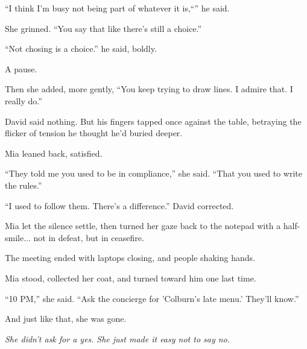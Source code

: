 ``I think I’m busy not being part of whatever it is,``'' he said.

She grinned. ``You say that like there’s still a choice.''

``Not chosing is a choice.'' he said, boldly.

A pause.

Then she added, more gently, ``You keep trying to draw lines. I admire that. I really do.''

David said nothing. But his fingers tapped once against the table, betraying the flicker of tension he thought 
he’d buried deeper.

Mia leaned back, satisfied.

``They told me you used to be in compliance,'' she said. ``That you used to write the rules.''

``I used to follow them. There's a difference.'' David corrected.

Mia let the silence settle, then turned her gaze back to the notepad with a half-smile... not in defeat, but in ceasefire.

The meeting ended with laptops closing, and people shaking hands.

Mia stood, collected her coat, and turned toward him one last time.

``10 PM,'' she said. ``Ask the concierge for 'Colburn’s late menu.' They'll know.''

And just like that, she was gone.

\textit{She didn’t ask for a yes.}
\textit{She just made it easy not to say no.}

\medskip

